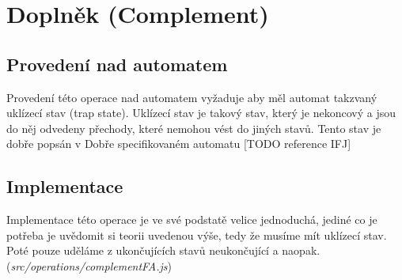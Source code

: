 \section{Doplněk (Complement)}
\subsection{Provedení nad automatem}
Provedení této operace nad automatem vyžaduje aby měl automat takzvaný uklízecí stav (trap state). Uklízecí stav je takový stav, který je nekoncový a jsou do něj odvedeny přechody, které nemohou vést do jiných stavů. Tento stav je dobře popsán v Dobře specifikovaném automatu [TODO reference IFJ]

\subsection{Implementace}
Implementace této operace je ve své podstatě velice jednoduchá, jediné co je potřeba je uvědomit si teorii uvedenou výše, tedy že musíme mít uklízecí stav. Poté pouze uděláme z ukončujících stavů neukončující a naopak.\\
(\textit{src/operations/complementFA.js})